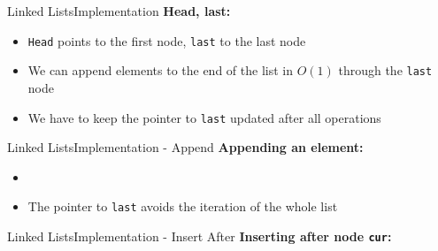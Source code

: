 \begin{frame}{Linked Lists}{Implementation}
  \textbf{Head, last:}
    \begin{flushleft}
    
  \end{flushleft}
  \begin{itemize}
    \item<3->
      \texttt{Head} points to the first node, \texttt{last} to the last node
    \item<4->
      We can append elements to the end of the list in $O(1)$ through
      the \texttt{last} node
    \item<5->
      We have to keep the pointer to \texttt{last} updated after all operations
  \end{itemize}
\end{frame}


\begin{frame}[fragile]{Linked Lists}{Implementation - Append}
  \textbf{Appending an element:}
  \begin{flushleft}
    
  \end{flushleft}
  \begin{itemize}
  \item<3->
    \vspace{-1.0em}
      
    \item<4->
      \vspace{-1.0em}
      The pointer to \texttt{last} avoids the iteration of the whole list
  \end{itemize}
\end{frame}


\begin{frame}{Linked Lists}{Implementation - Insert After}
  \textbf{Inserting after node \texttt{cur}:}
  \begin{flushleft}
    
  \end{flushleft}
\end{frame}

